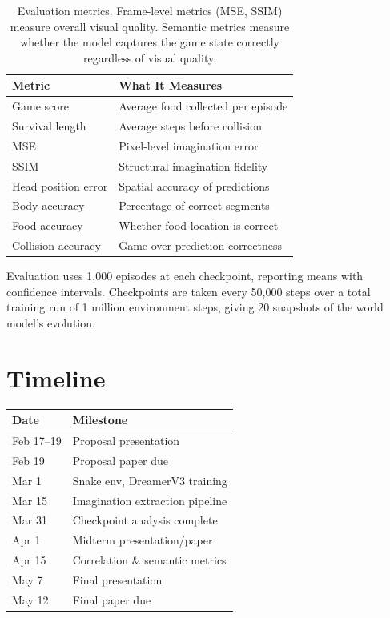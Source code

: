 \documentclass[letterpaper]{article}
\begin{document}
\begin{table}[h]
\centering
\begin{tabular}{ll}
\toprule
\textbf{Metric} & \textbf{What It Measures} \\
\midrule
Game score & Average food collected per episode \\
Survival length & Average steps before collision \\
MSE & Pixel-level imagination error \\
SSIM & Structural imagination fidelity \\
Head position error & Spatial accuracy of predictions \\
Body accuracy & Percentage of correct segments \\
Food accuracy & Whether food location is correct \\
Collision accuracy & Game-over prediction correctness \\
\bottomrule
\end{tabular}
\caption{Evaluation metrics. Frame-level metrics (MSE, SSIM) measure overall visual quality. Semantic metrics measure whether the model captures the game state correctly regardless of visual quality.}
\label{tab:metrics}
\end{table}

Evaluation uses 1,000 episodes at each checkpoint, reporting means with confidence intervals. Checkpoints are taken every 50,000 steps over a total training run of 1 million environment steps, giving 20 snapshots of the world model's evolution.

\section{Timeline}

\begin{tabular}{lp{4.2cm}}
\toprule
\textbf{Date} & \textbf{Milestone} \\
\midrule
Feb 17--19 & Proposal presentation \\
Feb 19 & Proposal paper due \\
Mar 1 & Snake env, DreamerV3 training \\
Mar 15 & Imagination extraction pipeline \\
Mar 31 & Checkpoint analysis complete \\
Apr 1 & Midterm presentation/paper \\
Apr 15 & Correlation \& semantic metrics \\
May 7 & Final presentation \\
May 12 & Final paper due \\
\bottomrule
\end{tabular}
\end{document}
